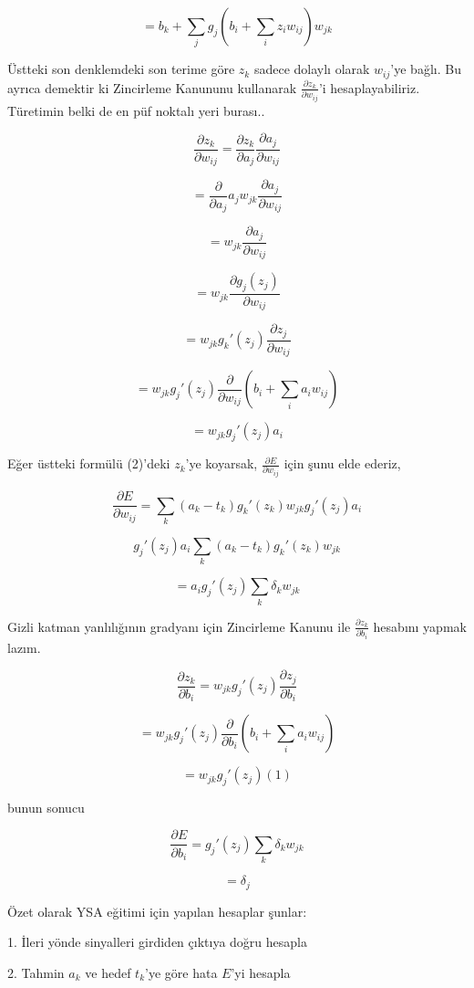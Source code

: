 \documentclass[12pt,fleqn]{article}\usepackage{../../common}
\begin{document}
$$ = b_k + \sum_j g_j (b_i + \sum_i z_i w_{ij})w_{jk}  $$

Üstteki son denklemdeki son terime göre $z_k$ sadece dolaylı olarak
$w_{ij}$'ye bağlı. Bu ayrıca demektir ki Zincirleme Kanununu kullanarak
$\frac{\partial z_k}{\partial w_{ij}}$'i hesaplayabiliriz. Türetimin belki
de en püf noktalı yeri burası.. 

$$ 
\frac{\partial z_k}{\partial w_{ij}} =
\frac{\partial z_k}{\partial a_j}\frac{\partial a_j}{\partial w_{ij}}
$$

$$ = \frac{\partial }{\partial a_j} a_j w_{jk} \frac{\partial a_j}{\partial w_{ij}}$$

$$ = w_{jk} \frac{\partial a_j}{\partial w_{ij}}$$

$$ = w_{jk} \frac{\partial g_j(z_j)}{\partial w_{ij}}$$

$$ = w_{jk}g_k'(z_j)\frac{\partial z_j}{\partial w_{ij}}$$

$$ = w_{jk}g_j'(z_j) \frac{\partial }{\partial w_{ij}}(b_i + \sum_i a_iw_{ij})$$

$$ = w_{jk}g_j'(z_j)a_i$$

Eğer üstteki formülü (2)'deki $z_k$'ye koyarsak, $\frac{\partial E}{\partial w_{ij}}$ 
için şunu elde ederiz, 

$$ \frac{\partial E}{\partial w_{ij}} = 
\sum_k (a_k-t_k)g_k'(z_k)w_{jk}g_j'(z_j)a_i
$$

$$ g_j'(z_j)a_i \sum_k (a_k-t_k)g_k'(z_k)w_{jk} $$

$$ = a_ig_j'(z_j) \sum_k \delta_k w_{jk} $$

Gizli katman yanlılığının gradyanı için Zincirleme Kanunu ile 
$\frac{\partial z_k}{\partial b_i}$ hesabını yapmak lazım. 

$$ \frac{\partial z_k}{\partial b_i} = 
w_{jk}g_j'(z_j) \frac{\partial z_j}{\partial b_i} 
$$

$$ = w_{jk}g_j'(z_j) \frac{\partial }{\partial b_i} (b_i + \sum_i a_iw_{ij})$$

$$ = w_{jk}g_j'(z_j) (1)$$

bunun sonucu

$$ \frac{\partial E}{\partial b_i} = g_j'(z_j) \sum_k \delta_k w_{jk} $$

$$ = \delta_j $$

Özet olarak YSA eğitimi için yapılan hesaplar şunlar: 

1. İleri yönde sinyalleri girdiden çıktıya doğru hesapla

2. Tahmin $a_k$ ve hedef $t_k$'ye göre hata $E$'yi hesapla
\end{document}
